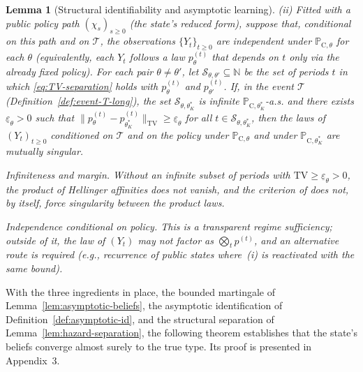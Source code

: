 \documentclass[review,authoryear,12pt]{elsarticle}
\theoremstyle{plain}
\newtheorem{lemma}[theorem]{Lemma}
\theoremstyle{definition}
\newcommand{\ProbC}[1]{\mathbb{P}_{\mathrm{C},#1}}
\newcommand{\1}{\mathbf{1}}
\begin{document}
\begin{lemma}[Structural identifiability and asymptotic learning]
\medskip
\noindent\textup{(ii)}
Fitted with a public policy path $(\chi_s)_{s\ge 0}$ \textup{(}the state's reduced form\textup{)}, suppose that, conditional on this path and on $\mathcal{T}$, the observations $\{Y_t\}_{t\ge 0}$ are independent under $\ProbC{\theta}$ for each $\theta$ \textup{(}equivalently, each $Y_t$ follows a law $p_\theta^{(t)}$ that depends on $t$ only via the already fixed policy\textup{)}. For each pair $\theta\neq\theta'$, let $\mathcal{S}_{\theta,\theta'}\subseteq\mathbb{N}$ be the set of periods $t$ in which \eqref{eq:TV-separation} holds with $p_\theta^{(t)}$ and $p_{\theta'}^{(t)}$. If, in the event $\mathcal{T}$ \textup{(}Definition~\ref{def:event-T-long}\textup{)}, the set $\mathcal{S}_{\theta,\theta_K^\ast}$ is infinite $\ProbC{\theta_K^\ast}$-a.s. and there exists $\underline{\varepsilon}_{\theta}>0$ such that $\|p_\theta^{(t)}-p_{\theta_K^\ast}^{(t)}\|_{\mathrm{TV}}\ge \underline{\varepsilon}_{\theta}$ for all $t\in\mathcal{S}_{\theta,\theta_K^\ast}$, then the laws of $(Y_t)_{t\ge 0}$ conditioned on $\mathcal{T}$ and on the policy under $\ProbC{\theta}$ and under $\ProbC{\theta_K^\ast}$ are mutually singular.

\medskip
\begin{list}{}{%
  \setlength{\leftmargin}{2.25em}%
  \setlength{\labelwidth}{2.25em}%
  \setlength{\labelsep}{0.45em}%
  \setlength{\itemsep}{0.35em}%
  \setlength{\parsep}{0pt}%
  \setlength{\topsep}{0.25em}%
}
\item[\textup{(C3)}] \textup{Infiniteness and margin.}\quad
Without an infinite subset of periods with $\mathrm{TV}\ge\underline{\varepsilon}_\theta>0$, the product of Hellinger affinities does not vanish, and the criterion of \citet{Kakutani1948} does not, by itself, force singularity between the product laws.
\item[\textup{(C4)}] \textup{Independence conditional on policy.}\quad
This is a transparent regime sufficiency; outside of it, the law of $(Y_t)$ may not factor as $\bigotimes_t p^{(t)}$, and an alternative route is required \textup{(}e.g., recurrence of public states where~\textup{(i)} is reactivated with the same bound\textup{)}.
\end{list}
\end{lemma}

With the three ingredients in place, the bounded martingale of Lemma~\ref{lem:asymptotic-beliefs}, the asymptotic identification of Definition~\ref{def:asymptotic-id}, and the structural separation of Lemma~\ref{lem:hazard-separation}, the following theorem establishes that the state's beliefs converge almost surely to the true type. Its proof is presented in Appendix~3.
\end{document}
